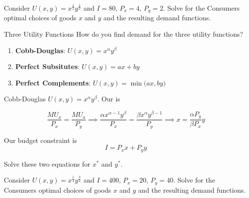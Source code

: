 \documentclass[12pt,t]{beamer}
\begin{document}
\begin{frame}
  
  \bigskip
  Consider $U(x,y) = x^{\frac{1}{2}}y^{\frac{1}{2}}$ and $I=80$, $P_{x} = 4$, $P_{y}=2$. Solve for the Consumers optimal choices of goods $x$ and $y$ and the resulting demand functions.
\end{frame}

\begin{frame}{Three Utility Functions}
  How do you find demand for the three utility functions?
  \begin{enumerate}
    \item \textbf{Cobb-Douglas}: $U(x,y) = x^\alpha y^\beta$
    
    \vspace{1.4cm}
    \item \textbf{Perfect Subsitutes}: $U(x,y) = ax + by$
    
    \vspace{1.4cm}
    \item \textbf{Perfect Complements}: $U(x,y) = \min\big(ax, by\big)$
  \end{enumerate}
\end{frame}

\begin{frame}{Cobb-Douglas}
  $U(x,y) = x^\alpha y^\beta$. Our  is 
  
  $$
    \frac{MU_x}{P_x} = \frac{MU_a}{P_y} 
    \implies \frac{\alpha x^{\alpha - 1} y^{\beta}}{P_x} = \frac{\beta x^{\alpha} y^{\beta - 1}}{P_y} 
    \implies x = \frac{\alpha P_y}{\beta P_x} y
  $$

  \bigskip
  Our budget constraint is 
  $$
    I = P_x x + P_y y
  $$

  \bigskip
  Solve these two equations for $x^*$ and $y^*$.
\end{frame}

\begin{frame}
  
  \bigskip
  Consider $U(x,y) = x^{\frac{1}{4}}y^{\frac{3}{4}}$ and $I=400$, $P_{x} = 20$, $P_{y}=40$. Solve for the Consumers optimal choices of goods $x$ and $y$ and the resulting demand functions.
\end{frame}
\end{document}
